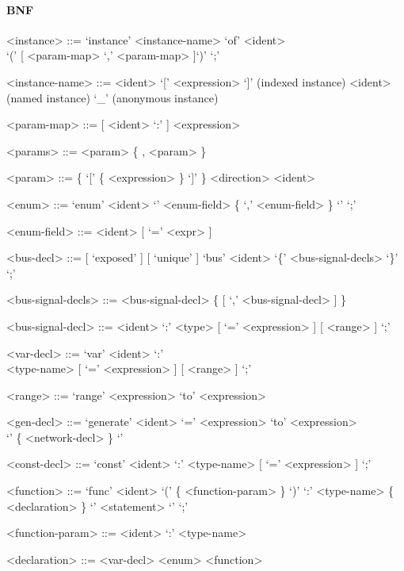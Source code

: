 \documentclass{article}
\begin{document}
\paragraph{BNF}
\begin{grammar}

  <instance> ::= `instance' <instance-name> `of' <ident> \\`(' [ <param-map> { `,' <param-map> } ]`)' `;'

  <instance-name> ::= <ident> `[' <expression> `]' (indexed instance)
  \alt <ident> (named instance)
  \alt `_' (anonymous instance)

  <param-map> ::= [ <ident> `:' ] <expression>

  <params> ::= <param> \{ , <param> \}

  <param> ::= \{ `[' \{ <expression> \} `]' \} <direction> <ident>

  <enum> ::= `enum' <ident> `{' <enum-field> \{ `,' <enum-field>  \} `}' `;'

  <enum-field> ::= <ident> [ `=' <expr> ]

  <bus-decl> ::= [ `exposed' ] [ `unique' ] `bus' <ident> `\{' <bus-signal-decls> `\}'  `;'

  <bus-signal-decls> ::= <bus-signal-decl> \{ [ `,' <bus-signal-decl> ] \}

  <bus-signal-decl> ::= <ident> `:' <type> [ `=' <expression> ] [ <range> ] `;'

  <var-decl> ::= `var' <ident> `:' \\ <type-name> [ `=' <expression> ] [ <range> ] `;'

  <range> ::= `range' <expression> `to' <expression>

  <gen-decl> ::= `generate' <ident> `=' <expression> `to' <expression> \\ `{' \{ <network-decl> \} `}'

  <const-decl> ::= `const' <ident> `:' <type-name> [ `=' <expression> ] `;'

  <function> ::= `func' <ident> `(' \{ <function-param> \} `)' `:' <type-name>
  \{ <declaration> \} `{' { <statement> } `}' `;'

  <function-param> ::= <ident> `:' <type-name>

  <declaration> ::= <var-decl>
  \alt <enum>
  \alt <function>

\end{grammar}
\end{document}
